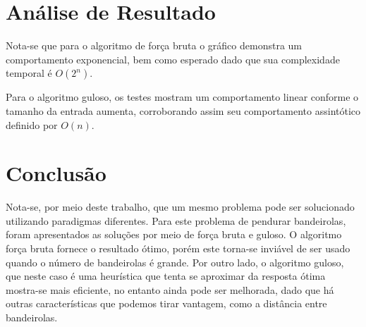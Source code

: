 \documentclass[
	12pt,
	a4paper,
	onepage,
	brazil
]{article}
\begin{document}
	\section{Análise de Resultado}
	
	Nota-se que para o algoritmo de força bruta o gráfico demonstra um comportamento exponencial, bem como esperado dado que sua complexidade temporal é $O(2^n)$.
	
	Para o algoritmo guloso, os testes mostram um comportamento linear conforme o tamanho da entrada aumenta, corroborando assim seu comportamento assintótico definido por $O(n)$.
	
	\section{Conclusão}
	
	Nota-se, por meio deste trabalho, que um mesmo problema pode ser solucionado utilizando paradigmas diferentes. Para este problema de pendurar bandeirolas, foram apresentados as soluções por meio de força bruta e guloso. O algoritmo força bruta fornece o resultado ótimo, porém este torna-se inviável de ser usado quando o número de bandeirolas é grande. Por outro lado, o algoritmo guloso, que neste caso é uma heurística que tenta se aproximar da resposta ótima mostra-se mais eficiente, no entanto ainda pode ser melhorada, dado que há outras características que podemos tirar vantagem, como a distância entre bandeirolas.
	
	\nocite{*}
	
	\printbibliography[title=Referências]
\end{document}

